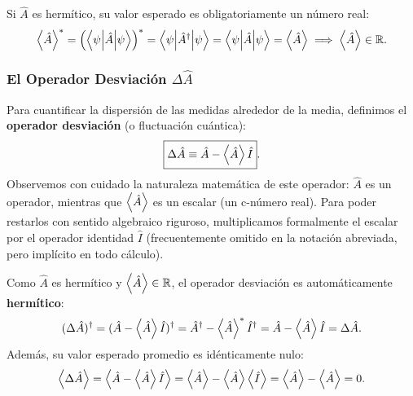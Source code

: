 Si $\hat{A}$ es hermítico, su valor esperado es obligatoriamente un número real:
\begin{equation}
    \left\langle \hat{A} \right\rangle^* = \left(\left\langle \psi \middle| \hat{A} \middle| \psi \right\rangle\right)^* = \left\langle \psi \middle| \hat{A}^\dagger \middle| \psi \right\rangle = \left\langle \psi \middle| \hat{A} \middle| \psi \right\rangle = \left\langle \hat{A} \right\rangle \implies \left\langle \hat{A} \right\rangle \in \mathbb{R}.
\end{equation}

\subsubsection{El Operador Desviación \texorpdfstring{$\Delta\hat{A}$}{Delta A}}
Para cuantificar la dispersión de las medidas alrededor de la media, definimos el \textbf{operador desviación} (o fluctuación cuántica):
\begin{equation}
    \boxed{\Delta\hat{A} \equiv \hat{A} - \left\langle \hat{A} \right\rangle\hat{I}}.
    \label{eq:deviation_operator}
\end{equation}
Observemos con cuidado la naturaleza matemática de este operador: $\hat{A}$ es un operador, mientras que $\left\langle \hat{A} \right\rangle$ es un escalar (un c-número real). Para poder restarlos con sentido algebraico riguroso, multiplicamos formalmente el escalar por el operador identidad $\hat{I}$ (frecuentemente omitido en la notación abreviada, pero implícito en todo cálculo).

\begin{alertabox}
    Como $\hat{A}$ es hermítico y $\left\langle \hat{A} \right\rangle \in \mathbb{R}$, el operador desviación es automáticamente \textbf{hermítico}:
    \begin{equation}
        (\Delta\hat{A})^\dagger = (\hat{A} - \left\langle \hat{A} \right\rangle\hat{I})^\dagger = \hat{A}^\dagger - \left\langle \hat{A} \right\rangle^*\hat{I}^\dagger = \hat{A} - \left\langle \hat{A} \right\rangle\hat{I} = \Delta\hat{A}.
    \end{equation}
    Además, su valor esperado promedio es idénticamente nulo:
    \begin{equation}
        \left\langle \Delta\hat{A} \right\rangle = \left\langle \hat{A} - \left\langle \hat{A} \right\rangle\hat{I} \right\rangle = \left\langle \hat{A} \right\rangle - \left\langle \hat{A} \right\rangle\left\langle \hat{I} \right\rangle = \left\langle \hat{A} \right\rangle - \left\langle \hat{A} \right\rangle = 0.
    \end{equation}
\end{alertabox}

